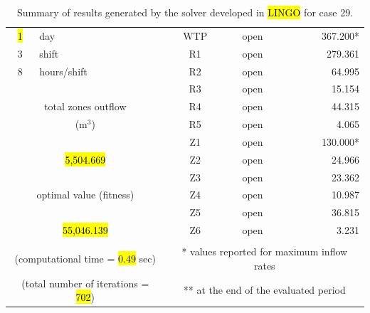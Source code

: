 \documentclass{singlecol}
\theoremstyle{TH}{
\newtheorem{lemma}{Lemma}
\newtheorem{theorem}[lemma]{Theorem}
\newtheorem{corrolary}[lemma]{Corrolary}
\newtheorem{conjecture}[lemma]{Conjecture}
\newtheorem{proposition}[lemma]{Proposition}
\newtheorem{claim}[lemma]{Claim}
\newtheorem{stheorem}[lemma]{Wrong Theorem}
\newtheorem{algorithm}{Algorithm}
}
\theoremstyle{THrm}{
\newtheorem{definition}{Definition}[section]
\newtheorem{question}{Question}[section]
\newtheorem{remark}{Remark}
\newtheorem{scheme}{Scheme}
}
\theoremstyle{THhit}{
\newtheorem{case}{Case}[section]
}
\begin{document}
\begin{table}[h!]
\begin{center}
\begin{small}
\begin{tabular}{ c r r r r r }
		   \\
		\hl{1}   &  \multicolumn{1}{l}{day}   &              		& \multicolumn{1}{c}{WTP}    & \multicolumn{1}{c}{open} &  367.200* \\
		3   &  \multicolumn{1}{l}{shift}  &         			& \multicolumn{1}{c}{R1}     & \multicolumn{1}{c}{open} &  279.361  \\
		8   &  \multicolumn{1}{l}{hours/shift}        &         & \multicolumn{1}{c}{R2}     & \multicolumn{1}{c}{open} &   64.995  \\
	   &      &              									& \multicolumn{1}{c}{R3}     & \multicolumn{1}{c}{open} &   15.154  \\
	   \multicolumn{3}{c}{total zones outflow}                  & \multicolumn{1}{c}{R4}     & \multicolumn{1}{c}{open} &   44.315  \\
	   \multicolumn{3}{c}{($\mathrm{m^3}$)}              				& \multicolumn{1}{c}{R5}     & \multicolumn{1}{c}{open} &    4.065  \\
	   &      &              									& \multicolumn{1}{c}{Z1}     & \multicolumn{1}{c}{open} &  130.000* \\
	   \multicolumn{3}{c}{\hl{5,504.669}}              			& \multicolumn{1}{c}{Z2}     & \multicolumn{1}{c}{open} &   24.966  \\
	      &              &              						& \multicolumn{1}{c}{Z3}     & \multicolumn{1}{c}{open} &   23.362  \\
	   \multicolumn{3}{c}{optimal value (fitness)}              & \multicolumn{1}{c}{Z4}     & \multicolumn{1}{c}{open} &   10.987  \\
	   &             &             						 		& \multicolumn{1}{c}{Z5}     & \multicolumn{1}{c}{open} &   36.815  \\
	   \multicolumn{3}{c}{\hl{55,046.139}}              			& \multicolumn{1}{c}{Z6}     & \multicolumn{1}{c}{open} &    3.231 \\
	   \\
	   \multicolumn{3}{c}{(computational time = \hl{0.49} sec)} & \multicolumn{3}{c}{* values reported for maximum inflow rates} \\
	   \multicolumn{3}{c}{(total number of iterations = \hl{702})} & \multicolumn{3}{c}{** at the end of the evaluated period} 

	\end{tabular}
\caption{Summary of results generated by the solver developed in \hl{LINGO} for case 29.}
\label{tab:lingoEvaluationsCase29}
\end{small}
\end{center}
\end{table}
\end{document}
